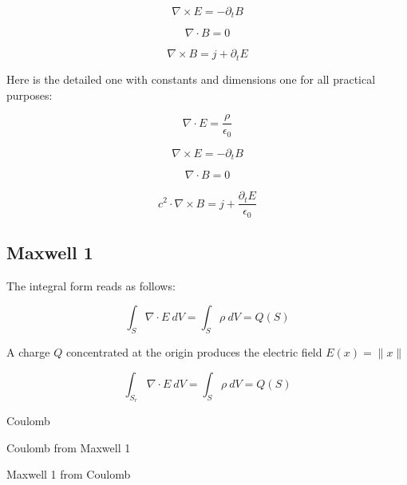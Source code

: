 \documentclass{article}
\begin{document}
\begin{equation}
\label{eqn:M2}
\nabla \times E = - \partial_t B
\end{equation}

\begin{equation}
\label{eqn:M3}
\nabla \cdot B = 0
\end{equation}

\begin{equation}
\label{eqn:M4}
\nabla \times B = j + \partial_t E
\end{equation}

Here is the detailed one with constants and dimensions one for all practical purposes:

\begin{equation}
\label{eqn:M1c}
\nabla \cdot E = \frac{\rho}{\epsilon_0}
\end{equation}

\begin{equation}
\label{eqn:M2c}
\nabla \times E = - \partial_t B
\end{equation}

\begin{equation}
\label{eqn:M3c}
\nabla \cdot B = 0
\end{equation}

\begin{equation}
\label{eqn:M4c}
c^2 \cdot \nabla \times B = j + \frac{\partial_t E}{\epsilon_0}
\end{equation}

\subsection{Maxwell 1}

The integral form reads as follows:

\begin{equation}
\label{eq: m1_int_}
\int_S \nabla \cdot E \: dV = \int_{S} \rho \: dV = Q(S)
\end{equation}

A charge $Q$ concentrated at the origin produces the electric field $E(x) = \lVert x \rVert $

\begin{equation}
\label{eq: m1_int}
\int_{S_r} \nabla \cdot E \: dV = \int_{S} \rho \: dV = Q(S)
\end{equation}

Coulomb 

Coulomb from Maxwell 1

Maxwell 1 from Coulomb
\end{document}

